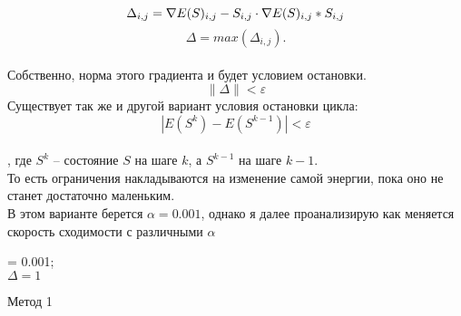 \documentclass[ 12pt,x11names]{article}
\begin{document}
\begin{equation}
\label{eq:pareto mle2}
    \Delta_{i, j} = \nabla E(S)_{i, j} - S_{i, j} \cdot \nabla E(S)_{i, j} * S_{i, j}\\
\end{equation}
   \begin{equation}
\label{eq:pareto mle2}
    \Delta = max(\Delta_{i, j}).
 \end{equation}\\
    Собственно, норма этого градиента и будет условием остановки.
    \begin{equation}
\label{eq:pareto mle2}
    \| \Delta \|< \varepsilon
    \end{equation}
    Существует так же и другой вариант условия остановки цикла:\\
  \begin{equation}
\label{eq:pareto mle2}
     | E(S^k) - E(S^{k-1}) | < \varepsilon
\end{equation}\\
     , где $S^k$ -- состояние $S$ на шаге $k$, а $S^{k-1}$ на шаге $k-1$.\\
     То есть ограничения накладываются на изменение самой энергии, пока оно не станет достаточно маленьким.\\
    В этом варианте берется $\alpha = 0.001$, однако я далее проанализирую как меняется скорость сходимости  с различными $\alpha$\\
    \begin{algorithm}[H]
		\SetAlgoLined
		\alpha = 0.001;\\
		$ \Delta  = 1$\\
	\caption{Метод 1}
    \end{algorithm}
\end{document}
